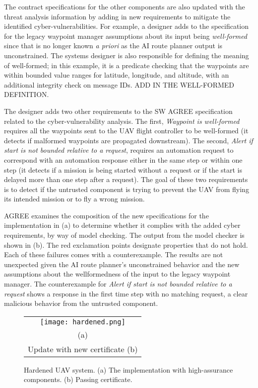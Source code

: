The contract specifications for the other components are also updated with the threat analysis information by adding in new requirements to mitigate the identified cyber-vulnerabilities.
For example, a designer adds to the specification for the legacy waypoint manager assumptions about its input being \emph{well-formed} since that is no longer known \emph{a priori} as the AI route planner output is unconstrained.
The systems designer is also responsible for defining the meaning of well-formed; in this example, it is a predicate checking that the waypoints are within bounded value ranges for latitude, longitude, and altitude, with an additional integrity check on message IDs.
ADD IN THE WELL-FORMED DEFINITION.

The designer adds two other requirements to the SW AGREE specification related to the cyber-vulnerability analysis.
The first, \emph{Waypoint is well-formed} requires all the waypoints sent to the UAV flight controller to be well-formed (it detects if malformed waypoints are propagated downstream).
The second, \emph{Alert if start is not bounded relative to a request}, requires an automation request to correspond with an automation response either in the same step or within one step (it detects if a mission is being started without a request or if the start is delayed more than one step after a request).
The goal of these two requirements is to detect if the untrusted component is trying to prevent the UAV from flying its intended mission or to fly a wrong mission. 

AGREE examines the composition of the new specifications for the implementation in (a) to determine whether it complies with the added cyber requirements, by way of model checking.
The output from the model checker is shown in (b).
The red exclamation points designate properties that do not hold. Each of these failures comes with a counterexample.
The results are not unexpected given the AI route planner's unconstrained behavior and the new assumptions about the wellformedness of the input to the legacy waypoint manager.
The counterexample for \emph{Alert if start is not bounded relative to a request} shows a response in the first time step with no matching request, a clear malicious behavior from the untrusted component.

\begin{figure*}
  \begin{center}
    \begin{tabular}{c}
      \texttt{[image: hardened.png]} \\
      (a) \\
      Update with new certificate
      (b)
    \end{tabular}
  \end{center}
  \caption{Hardened UAV system. (a) The implementation with high-assurance components. (b) Passing certificate.}
  \label{fig:hardened}
\end{figure*}

